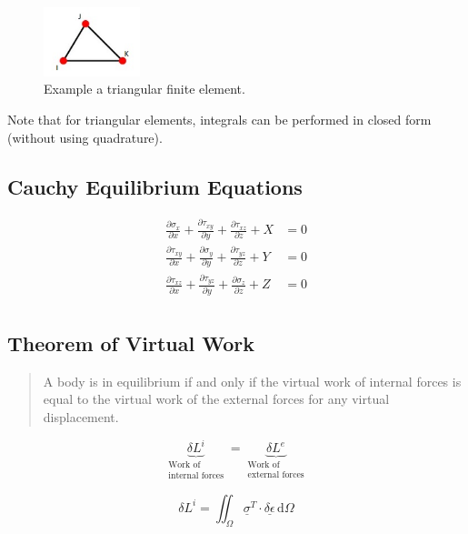 \documentclass{article}
\begin{document}
		
\begin{figure}[h!]
	\centering
		\includegraphics[width=0.25\textwidth]{./images/triangle_fe.jpg}
	\caption{Example a triangular finite element.}
	\label{fig:triangle_fe}
\end{figure}
        

    Note that for triangular elements, integrals can be performed in closed
form (without using quadrature).

\subsection{Cauchy Equilibrium
Equations}\label{cauchy-equilibrium-equations}


\begin{align*}
\frac{\partial \sigma_x}{\partial x} + \frac{\partial \tau_{xy}}{\partial y} +\frac{\partial \tau_{xz}}{\partial z} + X &= 0 \\
\frac{\partial \tau_{xy}}{\partial x} + \frac{\partial \sigma_y}{\partial y} +\frac{\partial \tau_{yz}}{\partial z} + Y &= 0 \\
\frac{\partial \tau_{xz}}{\partial x} + \frac{\partial \tau_{yz}}{\partial y} +\frac{\partial \sigma_z}{\partial z} + Z &= 0 \\
\end{align*}


    \subsection{Theorem of Virtual Work}\label{theorem-of-virtual-work}

\begin{quote}
A body is in equilibrium if and only if the virtual work of internal
forces is equal to the virtual work of the external forces for any
virtual displacement.
\end{quote}

\[
\underbrace{\delta L^i}_{\substack{\text{Work of}\\\text{internal forces}}} = \underbrace{\delta L^e}_{\substack{\text{Work of}\\\text{external forces}}}
\]

\[
\delta L^i = \iint_\Omega \underline{\sigma}^T \cdot \underline{\delta \epsilon}\, \mathrm{d}\Omega  
\]
\end{document}
